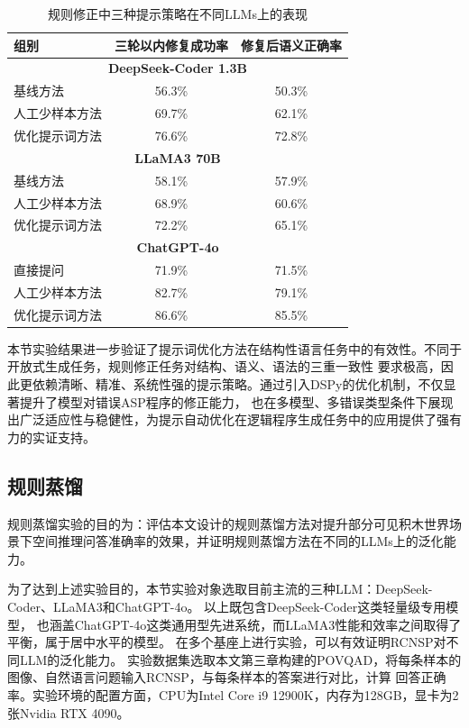 \begin{table}[h]
    \centering
    \begin{tabular}{lcc}
        \toprule
        \textbf{组别} & \textbf{三轮以内修复成功率} & \textbf{修复后语义正确率}\\
        \midrule
        \multicolumn{3}{c}{\textbf{DeepSeek-Coder 1.3B}} \\
        基线方法 & 56.3\% & 50.3\%\\
        人工少样本方法 & 69.7\% & 62.1\% \\
        优化提示词方法 & 76.6\% & 72.8\% \\
        \midrule
        \multicolumn{3}{c}{\textbf{LLaMA3 70B}} \\
        基线方法 & 58.1\% & 57.9\% \\
        人工少样本方法 & 68.9\% & 60.6\% \\
        优化提示词方法 & 72.2\% & 65.1\% \\
        \midrule
        \multicolumn{3}{c}{\textbf{ChatGPT-4o}} \\
        直接提问 & 71.9\% & 71.5\% \\
        人工少样本方法 & 82.7\% & 79.1\% \\
        优化提示词方法 & 86.6\% & 85.5\% \\
        \bottomrule
    \end{tabular}
    \caption{规则修正中三种提示策略在不同LLMs上的表现}
    \label{tab:rule-fix-result}
\end{table}

本节实验结果进一步验证了提示词优化方法在结构性语言任务中的有效性。不同于开放式生成任务，规则修正任务对结构、语义、语法的三重一致性
要求极高，因此更依赖清晰、精准、系统性强的提示策略。通过引入DSPy的优化机制，不仅显著提升了模型对错误ASP程序的修正能力，
也在多模型、多错误类型条件下展现出广泛适应性与稳健性，为提示自动优化在逻辑程序生成任务中的应用提供了强有力的实证支持。
\subsection{规则蒸馏}
规则蒸馏实验的目的为：评估本文设计的规则蒸馏方法对提升部分可见积木世界场景下空间推理问答准确率的效果，并证明规则蒸馏方法在不同的LLMs上的泛化能力。

为了达到上述实验目的，本节实验对象选取目前主流的三种LLM：DeepSeek-Coder、LLa\-MA3和ChatGPT-4o。
以上既包含DeepSeek-Coder这类轻量级专用模型，
也涵盖ChatGPT-4o这类通用型先进系统，而LLaMA3性能和效率之间取得了平衡，属于居中水平的模型。
在多个基座上进行实验，可以有效证明RCNSP对不同LLM的泛化能力。
实验数据集选取本文第三章构建的POVQAD，将每条样本的图像、自然语言问题输入RCNSP，与每条样本的答案进行对比，计算
回答正确率。实验环境的配置方面，CPU为Intel Core i9 12900K，内存为128GB，显卡为2张Nvidia RTX 4090。

